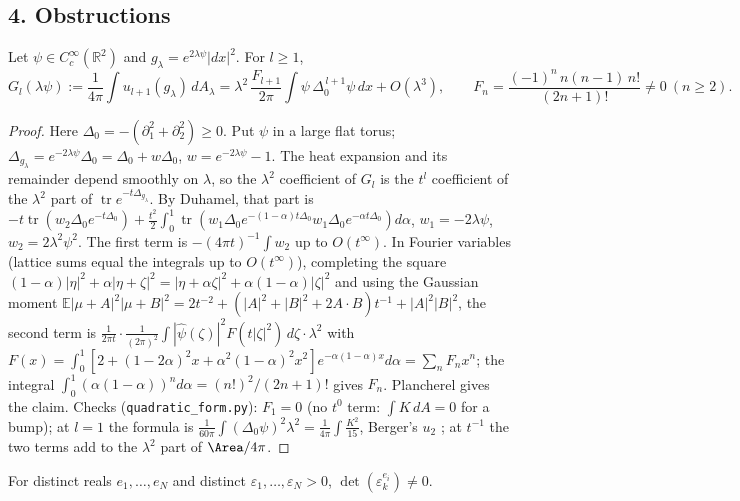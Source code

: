 \subsection*{4. Obstructions}

\begin{lemma}\label{vc:quad}
Let $\psi\in C_c^\infty(\mathbb R^2)$ and $g_\lambda=e^{2\lambda\psi}|dx|^2$. For $l\ge1$,
\[
G_l(\lambda\psi):=\frac1{4\pi}\int u_{l+1}(g_\lambda)\,dA_\lambda
=\lambda^2\,\frac{F_{l+1}}{2\pi}\int\psi\,\Delta_0^{\,l+1}\psi\,dx+O(\lambda^3),\qquad
F_n=\frac{(-1)^n\,n(n-1)\,n!}{(2n+1)!}\ne0\ (n\ge2).
\]
\end{lemma}

\begin{proof}
Here $\Delta_0=-(\partial_1^2+\partial_2^2)\ge0$. Put $\psi$ in a large flat torus; $\Delta_{g_\lambda}=e^{-2\lambda\psi}\Delta_0=\Delta_0+w\Delta_0$,
$w=e^{-2\lambda\psi}-1$. The heat expansion and its remainder depend smoothly on $\lambda$, so the
$\lambda^2$ coefficient of $G_l$ is the $t^l$ coefficient of the $\lambda^2$ part of
$\operatorname{tr}e^{-t\Delta_{g_\lambda}}$. By Duhamel, that part is
$-t\operatorname{tr}(w_2\Delta_0e^{-t\Delta_0})+\frac{t^2}2\int_0^1\operatorname{tr}(w_1\Delta_0e^{-(1-\alpha)t\Delta_0}w_1\Delta_0e^{-\alpha t\Delta_0})d\alpha$,
$w_1=-2\lambda\psi$, $w_2=2\lambda^2\psi^2$. The first term is $-(4\pi t)^{-1}\int w_2$ up to $O(t^\infty)$. In
Fourier variables (lattice sums equal the integrals up to $O(t^\infty)$), completing the square
$(1-\alpha)|\eta|^2+\alpha|\eta+\zeta|^2=|\eta+\alpha\zeta|^2+\alpha(1-\alpha)|\zeta|^2$ and using the Gaussian
moment $\mathbb E|\mu+A|^2|\mu+B|^2=2t^{-2}+(|A|^2+|B|^2+2A\cdot B)t^{-1}+|A|^2|B|^2$, the second term is
$\frac{1}{2\pi t}\cdot\frac1{(2\pi)^2}\int|\hat\psi(\zeta)|^2F(t|\zeta|^2)\,d\zeta\cdot\lambda^2$ with
$F(x)=\int_0^1[2+(1-2\alpha)^2x+\alpha^2(1-\alpha)^2x^2]e^{-\alpha(1-\alpha)x}d\alpha=\sum_nF_nx^n$; the
integral $\int_0^1(\alpha(1-\alpha))^nd\alpha=(n!)^2/(2n+1)!$ gives $F_n$. Plancherel gives the claim.
Checks (\texttt{quadratic\_form.py}): $F_1=0$ (no $t^0$ term: $\int K\,dA=0$ for a bump); at $l=1$ the
formula is $\frac1{60\pi}\int(\Delta_0\psi)^2\lambda^2=\frac1{4\pi}\int\frac{K^2}{15}$, Berger's $u_2$
\cite[(7)]{schueth2019}; at $t^{-1}$ the two terms add to the $\lambda^2$ part of $\Area/4\pi$.
\end{proof}

\begin{lemma}\label{vc:vdm}
For distinct reals $e_1,\dots,e_N$ and distinct $\varepsilon_1,\dots,\varepsilon_N>0$,
$\det(\varepsilon_k^{e_i})\ne0$.
\end{lemma}

